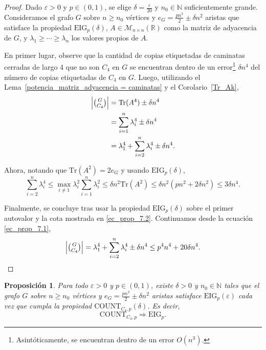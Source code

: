\documentclass{article}[14pts]
\newtheorem{prop}{Proposición}
\newcommand{\Count}{\mathrm{COUNT}}
\newcommand{\eig}{\mathrm{EIG}}
\newcommand{\Tr}{\mathrm{Tr}}
\let\varepsilon=\varepsilon
\begin{document}
\begin{proof}
    Dado $\varepsilon > 0$ y $p\in (0,1)$, se elige $\delta = \frac{\varepsilon}{20}$ y $n_0\in\mathbb{N}$ suficientemente grande. Consideramos el grafo $G$ sobre $n\geq n_0$ vértices y $e_G = \frac{pn^{2}}{2} \pm \delta n^{2}$ aristas que satisface la propiedad $\eig_p (\delta)$, $A\in \mathcal{M}_{n\times n}(\mathbb{R})$ como la matriz de adyacencia de $G$, y $\lambda_1 \geq \cdots \geq \lambda_n$ los valores propios de $A$.

    En primer lugar, observe que la cantidad de copias etiquetadas de caminatas cerradas de largo 4 que no son $C_4$ en $G$ se encuentran dentro de un error\footnote{Asintóticamente, se encuentran dentro de un error $O(n^{3})$.} $\delta n^{4}$ del número de copias etiquetadas de $C_4$ en $G$. Luego, utilizando el Lema~\ref{potencia_matriz_adyacencia = caminatas} y el Corolario~\ref{Tr_Ak},
    \begin{align} \label{ec_prop_7.1}
        \left|\tbinom{G}{C_4}\right| &= \Tr(A^{4}) \pm \delta n^{4} \nonumber\\
        &= \sum_{i = 1}^{n} \lambda_{i}^{4} \pm \delta n^{4} \nonumber\\
        &= \lambda_{1}^{4} + \sum_{i = 2}^{n} \lambda_{i}^{4} \pm \delta n^{4}.
    \end{align}

    Ahora, notando que $\Tr(A^{2}) = 2e_G$ y usando $\eig_p (\delta)$,
    \begin{equation} \label{ec_prop_7.2}
        \sum_{i = 2}^{n} \lambda_{i}^{4} \leq \max_{i \not = 1}\lambda_{i}^{2}\sum_{i = 1}^{n} \lambda_{i}^{2} \leq \delta n^{2}\Tr(A^{2}) \leq \delta n^{2}(pn^{2} + 2\delta n^{2}) \leq 3\delta n^{4}.
    \end{equation}

    Finalmente, se concluye tras usar la propiedad $\eig_p (\delta)$ sobre el primer autovalor y la cota mostrada en \eqref{ec_prop_7.2}. Continuamos desde la ecuación \eqref{ec_prop_7.1},
    \[
        \left|\tbinom{G}{C_4}\right| = \lambda_{1}^{4} + \sum_{i = 2}^{n}\lambda_{i}^{4} \pm \delta n^{4} \leq p^{4}n^{4} + 20\delta n^{4}.
    \]
\end{proof}\medskip

\begin{prop} \label{C4 => eig}
     Para todo $\varepsilon > 0$ y $p\in (0,1)$, existe $\delta > 0$ y $n_0\in\mathbb{N}$ tales que el grafo $G$ sobre $n\geq n_0$ vértices y $e_G = \frac{pn^{2}}{2} \pm \delta n^{2}$ aristas satisface $\eig_p(\varepsilon)$ cada vez que cumpla la propiedad $\Count_{C_4, p}(\delta)$. Es decir,
     \[
        \Count_{C_4,p} \Rightarrow \eig_p .
    \]
\end{prop}
\end{document}
